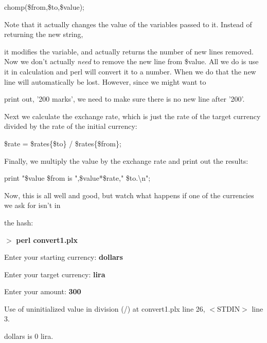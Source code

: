 \documentclass[a4paper,11pt]{book}
\begin{document}
\noindent 

\noindent chomp(\$from,\$to,\$value);

\noindent 

\noindent Note that it actually changes the value of the variables passed to it. Instead of returning the new string,

\noindent it modifies the variable, and actually returns the number of new lines removed. Now we don't actually \textit{need }to remove the new line from \$value. All we do is use it in calculation and perl will convert it to a number. When we do that the new line will automatically be lost. However, since we might want to

\noindent print out, '200 marks', we need to make sure there is no new line after '200'.

\noindent 

\noindent Next we calculate the exchange rate, which is just the rate of the target currency divided by the rate of the initial currency:

\noindent 

\noindent 

\noindent \$rate = \$rates\{\$to\} / \$rates\{\$from\};

\noindent 

\noindent Finally, we multiply the value by the exchange rate and print out the results:

\noindent 

\noindent 

\noindent print "\$value \$from is ",\$value*\$rate," \$to.\textbackslash n";

\noindent 

\noindent 

\noindent Now, this is all well and good, but watch what happens if one of the currencies we ask for isn't in

\noindent the hash:

\noindent 

\noindent $>$ \textbf{perl convert1.plx}

\noindent Enter your starting currency: \textbf{dollars}

\noindent Enter your target currency: \textbf{lira}

\noindent Enter your amount: \textbf{300}

\noindent Use of uninitialized value in division (/) at convert1.plx line 26, $<$STDIN$>$ line 3.

 dollars is 0 lira.
\end{document}

